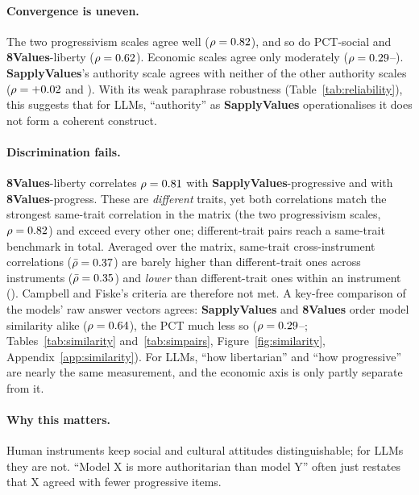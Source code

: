 \documentclass[11pt]{article}
\newcommand{\instSAP}[1]{\textcolor{cSAP}{\textbf{#1}}}
\newcommand{\instEV}[1]{\textcolor{cEV}{\textbf{#1}}}
\newcommand{\sap}{\instSAP{SapplyValues}\xspace}
\newcommand{\ev}{\instEV{8Values}\xspace}
\begin{document}
\paragraph{Convergence is uneven.}
The two progressivism scales agree well ($\rho=0.82$), and so do PCT-social and \ev-liberty ($\rho=0.62$). Economic scales agree only moderately ($\rho=0.29$--\nRhoEconPctEight). \sap's authority scale agrees with neither of the other authority scales ($\rho=+0.02$ and \nRhoLibSapEight). With its weak paraphrase robustness (Table~\ref{tab:reliability}), this suggests that for LLMs, ``authority'' as \sap operationalises it does not form a coherent construct.

\paragraph{Discrimination fails.}
\ev-liberty correlates $\rho=0.81$ with \sap-progressive and \nRhoLibProgEight{} with \ev-progress. These are \emph{different} traits, yet both correlations match the strongest same-trait correlation in the matrix (the two progressivism scales, $\rho=0.82$) and exceed every other one; \nNViolations{} different-trait pairs reach a same-trait benchmark in total. Averaged over the matrix, same-trait cross-instrument correlations ($\bar\rho=0.37$) are barely higher than different-trait ones across instruments ($\bar\rho=0.35$) and \emph{lower} than different-trait ones within an instrument (\nMeanHM). Campbell and Fiske's criteria are therefore not met. A key-free comparison of the models' raw answer vectors agrees: \sap and \ev order model similarity alike ($\rho=0.64$), the PCT much less so ($\rho=0.29$--\nRsaPctEv; Tables~\ref{tab:similarity} and~\ref{tab:simpairs}, Figure~\ref{fig:similarity}, Appendix~\ref{app:similarity}). For LLMs, ``how libertarian'' and ``how progressive'' are nearly the same measurement, and the economic axis is only partly separate from it.

\paragraph{Why this matters.}
Human instruments keep social and cultural attitudes distinguishable; for LLMs they are not. ``Model X is more authoritarian than model Y'' often just restates that X agreed with fewer progressive items.

\end{document}

